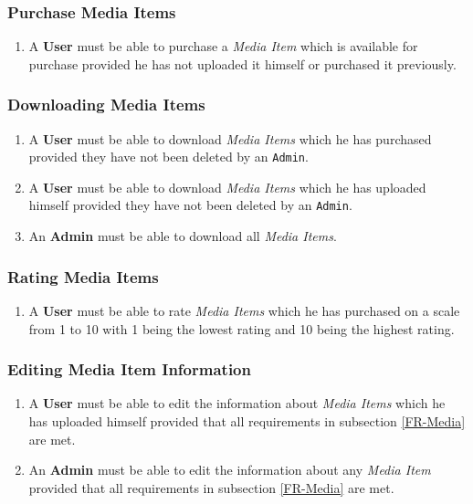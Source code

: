 \subsubsection {Purchase Media Items}

\begin{enumerate}[label=\textbf{FR-\twodigits*}, resume]
	\item A \textbf{User} must be able to purchase a \textit{Media Item} which is available for purchase provided he has not uploaded it himself or  purchased it previously.
\end{enumerate}

\subsubsection {Downloading Media Items}

\begin{enumerate}[label=\textbf{FR-\twodigits*}, resume]
	\item A \textbf{User} must be able to download \textit{Media Items} which he has purchased provided they have not been deleted by an \texttt{Admin}.
	\item A \textbf{User} must be able to download \textit{Media Items} which he has uploaded himself provided they have not been deleted by an \texttt{Admin}.
	\item An \textbf{Admin} must be able to download all \textit{Media Items}.
\end{enumerate}
		
\subsubsection {Rating Media Items} \label{FR-RatingMedia}

\begin{enumerate}[label=\textbf{FR-\twodigits*}, resume]
	\item A \textbf{User} must be able to rate \textit{Media Items} which he has purchased on a scale from 1 to 10 with 1 being the lowest rating and 10 being the highest rating.
\end{enumerate}

\subsubsection{Editing Media Item Information}

\begin{enumerate}[label=\textbf{FR-\twodigits*}, resume]
	\item A \textbf{User} must be able to edit the information about \textit{Media Items} which he has uploaded himself provided that all requirements in subsection \ref{FR-Media} are met.
	\item An \textbf{Admin} must be able to edit the information about any \textit{Media Item} provided that all requirements in subsection \ref{FR-Media} are met.
\end{enumerate}
			

